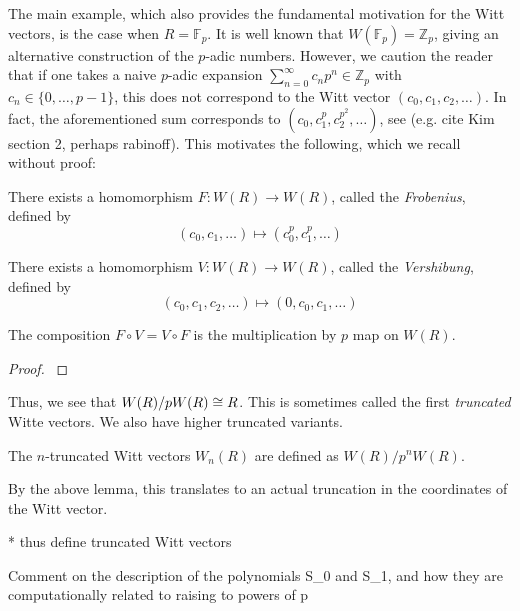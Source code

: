 The main example, which also provides the fundamental motivation
for the Witt vectors, is the case when \(R = \mathbb{F}_{p}\).
It is well known that \(W(\mathbb{F}_{p}) = \mathbb{Z}_{p}\), 
giving an alternative construction of the \(p\)-adic numbers.
However, we caution the reader that if one takes a
naive \(p\)-adic expansion 
\(\sum_{n = 0}^{\infty} c_{n}p^{n} \in \mathbb{Z}_{p}\)
with \(c_{n} \in \{0, \ldots, p-1\}\), this does not correspond
to the Witt vector \((c_{0}, c_{1}, c_{2}, \ldots)\).
In fact, the aforementioned sum corresponds to 
\((c_{0}, c_{1}^{p}, c_{2}^{p^{2}}, \ldots)\), see
(e.g. cite Kim section 2, perhaps rabinoff). 
This motivates the following, which we recall without proof:

\begin{defn}
	There exists a homomorphism \(F \colon W(R) \xrightarrow{} W(R)\),
	called the \textit{Frobenius},
	defined by
	\[
	 (c_{0}, c_{1}, \ldots) \mapsto (c_{0}^{p}, c_{1}^{p}, \ldots)
	\] 
\end{defn}

\begin{defn}
	There exists a homomorphism \(V \colon W(R) \xrightarrow{} W(R)\),
	called the \textit{Vershibung},
	defined by
	\[
		(c_{0}, c_{1}, c_{2}, \ldots) \mapsto  (0, c_{0}, c_{1}, \ldots)
	\] 
\end{defn}

\begin{lem}
	The composition \(F \circ V = V \circ F\) is the multiplication by
	\(p\) map on \(W(R)\).
\end{lem}

\begin{proof}
	\cite[Proposition~5]{kim-2017-witt-vec}
\end{proof}

Thus, we see that \(W(R) / pW(R) \cong R\).
This is sometimes called the first \textit{truncated}
Witte vectors.
We also have higher truncated variants.

\begin{defn}
	The \(n\)-truncated Witt vectors
	\(W_{n}(R)\) are defined as
	\(W(R) / p^{n}W(R)\).
\end{defn}

By the above lemma, this translates to an actual truncation
in the coordinates of the Witt vector.


* thus define truncated Witt vectors

Comment on the description of the polynomials S_0 and S_1,
and how they are computationally related to 
raising to powers of p

